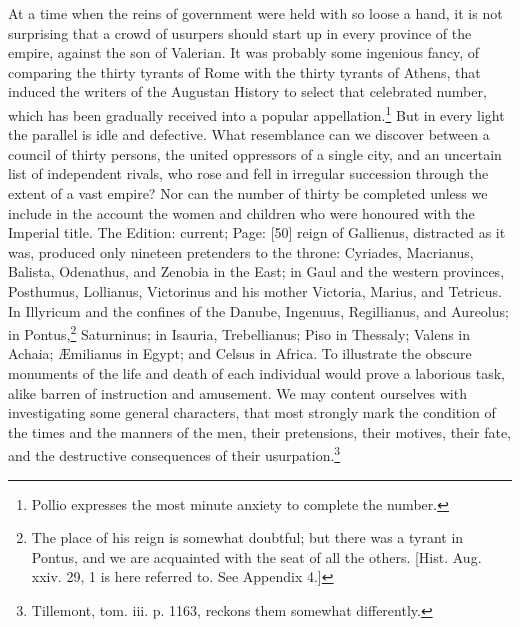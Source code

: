 At a time when the reins of government were held with so loose a hand, it is not surprising that a crowd of usurpers should start up in every province of the empire, against the son of Valerian. It was probably some ingenious fancy, of comparing the thirty tyrants of Rome with the thirty tyrants of Athens, that induced the writers of the Augustan History to select that celebrated number, which has been gradually received into a popular appellation.\footnote{Pollio expresses the most minute anxiety to complete the number.} But in every light the parallel is idle and defective. What resemblance can we discover between a council of thirty persons, the united oppressors of a single city, and an uncertain list of independent rivals, who rose and fell in irregular succession through the extent of a vast empire? Nor can the number of thirty be completed unless we include in the account the women and children who were honoured with the Imperial title. The Edition: current; Page: [50] reign of Gallienus, distracted as it was, produced only nineteen pretenders to the throne: Cyriades, Macrianus, Balista, Odenathus, and Zenobia in the East; in Gaul and the western provinces, Posthumus, Lollianus, Victorinus and his mother Victoria, Marius, and Tetricus. In Illyricum and the confines of the Danube, Ingenuus, Regillianus, and Aureolus; in Pontus,\footnote{The place of his reign is somewhat doubtful; but there was a tyrant in Pontus, and we are acquainted with the seat of all the others. [Hist. Aug. xxiv. 29, 1 is here referred to. See Appendix 4.]} Saturninus; in Isauria, Trebellianus; Piso in Thessaly; Valens in Achaia; Æmilianus in Egypt; and Celsus in Africa. To illustrate the obscure monuments of the life and death of each individual would prove a laborious task, alike barren of instruction and amusement. We may content ourselves with investigating some general characters, that most strongly mark the condition of the times and the manners of the men, their pretensions, their motives, their fate, and the destructive consequences of their usurpation.\footnote{Tillemont, tom. iii. p. 1163, reckons them somewhat differently.}

